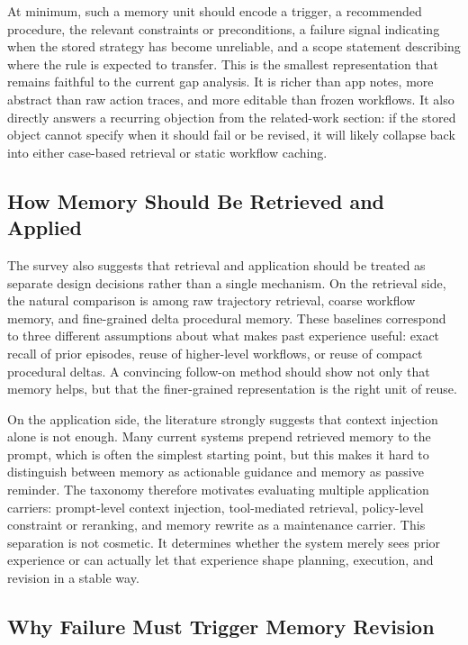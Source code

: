 \documentclass{article}
\begin{document}
At minimum, such a memory unit should encode a trigger, a recommended
procedure, the relevant constraints or preconditions, a failure signal
indicating when the stored strategy has become unreliable, and a scope
statement describing where the rule is expected to transfer. This is the
smallest representation that remains faithful to the current gap
analysis. It is richer than app notes, more abstract than raw action
traces, and more editable than frozen workflows. It also directly
answers a recurring objection from the related-work section: if the
stored object cannot specify when it should fail or be revised, it will
likely collapse back into either case-based retrieval or static workflow
caching.

\subsection{How Memory Should Be Retrieved and
Applied}\label{72-how-memory-should-be-retrieved-and-applied}

The survey also suggests that retrieval and application should be
treated as separate design decisions rather than a single mechanism. On
the retrieval side, the natural comparison is among raw trajectory
retrieval, coarse workflow memory, and fine-grained delta procedural
memory. These baselines correspond to three different assumptions about
what makes past experience useful: exact recall of prior episodes, reuse
of higher-level workflows, or reuse of compact procedural deltas. A
convincing follow-on method should show not only that memory helps, but
that the finer-grained representation is the right unit of reuse.

On the application side, the literature strongly suggests that context
injection alone is not enough. Many current systems prepend retrieved
memory to the prompt, which is often the simplest starting point, but
this makes it hard to distinguish between memory as actionable guidance
and memory as passive reminder. The taxonomy therefore motivates
evaluating multiple application carriers: prompt-level context
injection, tool-mediated retrieval, policy-level constraint or
reranking, and memory rewrite as a maintenance carrier. This separation
is not cosmetic. It determines whether the system merely sees prior
experience or can actually let that experience shape planning,
execution, and revision in a stable way.

\subsection{Why Failure Must Trigger Memory
Revision}\label{73-why-failure-must-trigger-memory-revision}
\end{document}
